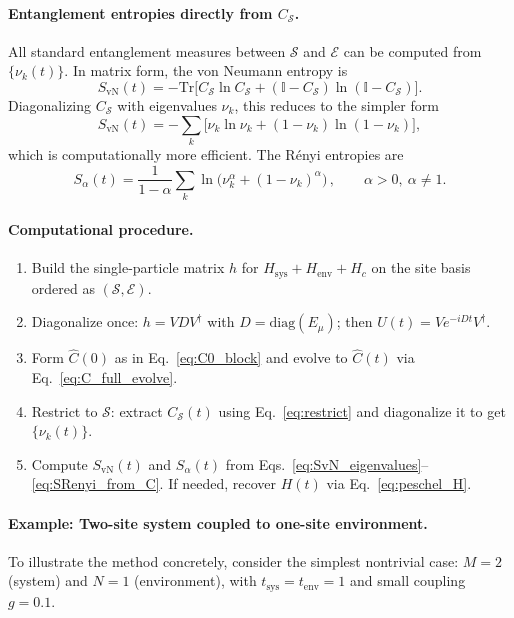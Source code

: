 \documentclass[12pt,oneside,openright]{report}
\theoremstyle{definition}
\theoremstyle{plain}
\theoremstyle{remark}
\newcommand{\beq}{\begin{equation}}
\newcommand{\eeq}{\end{equation}}
\begin{document}
\paragraph{Entanglement entropies directly from \(C_{\mathcal{S}}\).}
All standard entanglement measures between \(\mathcal{S}\) and \(\mathcal{E}\) can be computed from \(\{\nu_k(t)\}\). In matrix form, the von Neumann entropy is
\beq
 S_{\mathrm{vN}}(t)= -\mathrm{Tr}\!\Big[C_{\mathcal{S}}\ln C_{\mathcal{S}} + (\mathbb{I}-C_{\mathcal{S}})\ln(\mathbb{I}-C_{\mathcal{S}})\Big].
 \label{eq:SvN_matrix}
\eeq
Diagonalizing $C_{\mathcal{S}}$ with eigenvalues $\nu_k$, this reduces to the simpler form
\beq
 S_{\mathrm{vN}}(t) = -\sum_k\!\Big[\nu_k\ln\nu_k + (1-\nu_k)\ln(1-\nu_k)\Big],
 \label{eq:SvN_eigenvalues}
\eeq
which is computationally more efficient. The R\'enyi entropies are
\beq
 S_\alpha(t)=\frac{1}{1-\alpha}\sum_k \ln\!\Big(\nu_k^\alpha + (1-\nu_k)^\alpha\Big)\,,\qquad \alpha>0,\ \alpha\neq 1.
 \label{eq:SRenyi_from_C}
\eeq

\paragraph{Computational procedure.}
\begin{enumerate}
  \item Build the single-particle matrix \(h\) for \(H_\mathrm{sys}{+}H_\mathrm{env}{+}H_c\) on the site basis ordered as \((\mathcal{S},\mathcal{E})\).
  \item Diagonalize once: \(h=V D V^\dagger\) with \(D=\mathrm{diag}(E_\mu)\); then \(U(t)=V e^{-i D t} V^\dagger\).
  \item Form \(\hat C(0)\) as in Eq.~\eqref{eq:C0_block} and evolve to \(\hat C(t)\) via Eq.~\eqref{eq:C_full_evolve}.
  \item Restrict to \(\mathcal{S}\): extract \(C_{\mathcal{S}}(t)\) using Eq.~\eqref{eq:restrict} and diagonalize it to get \(\{\nu_k(t)\}\).
  \item Compute \(S_{\mathrm{vN}}(t)\) and \(S_\alpha(t)\) from Eqs.~\eqref{eq:SvN_eigenvalues}–\eqref{eq:SRenyi_from_C}. If needed, recover \(H(t)\) via Eq.~\eqref{eq:peschel_H}.
\end{enumerate}

\paragraph{Example: Two-site system coupled to one-site environment.}
To illustrate the method concretely, consider the simplest nontrivial case: $M=2$ (system) and $N=1$ (environment), 
with $t_{\mathrm{sys}}=t_{\mathrm{env}}=1$ and small coupling $g=0.1$.
\end{document}
